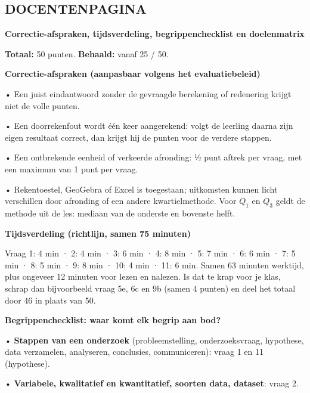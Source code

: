 \documentclass{article}
\begin{document}
\begin{docentenpagina}
\section{DOCENTENPAGINA}

\begin{oplossing}
\textbf{Correctie-afspraken, tijdsverdeling, begrippenchecklist en doelenmatrix}

\textbf{Totaal:} 50 punten. \textbf{Behaald:} vanaf 25 / 50.
\end{oplossing}

\begin{oplossing}
\textbf{Correctie-afspraken (aanpasbaar volgens het evaluatiebeleid)}

• Een juist eindantwoord zonder de gevraagde berekening of redenering krijgt niet de volle punten.

• Een doorrekenfout wordt één keer aangerekend: volgt de leerling daarna zijn eigen resultaat correct, dan krijgt hij de punten voor de verdere stappen.

• Een ontbrekende eenheid of verkeerde afronding: ½ punt aftrek per vraag, met een maximum van 1 punt per vraag.

• Rekentoestel, GeoGebra of Excel is toegestaan; uitkomsten kunnen licht verschillen door afronding of een andere kwartielmethode. Voor $Q_1$ en $Q_3$ geldt de methode uit de les: mediaan van de onderste en bovenste helft.
\end{oplossing}

\begin{oplossing}
\textbf{Tijdsverdeling (richtlijn, samen 75 minuten)}

Vraag 1: 4 min · 2: 4 min · 3: 6 min · 4: 8 min · 5: 7 min · 6: 6 min · 7: 5 min · 8: 5 min · 9: 8 min · 10: 4 min · 11: 6 min. Samen 63 minuten werktijd, plus ongeveer 12 minuten voor lezen en nalezen. Is dat te krap voor je klas, schrap dan bijvoorbeeld vraag 5e, 6c en 9b (samen 4 punten) en deel het totaal door 46 in plaats van 50.
\end{oplossing}

\begin{oplossing}
\textbf{Begrippenchecklist: waar komt elk begrip aan bod?}

• \textbf{Stappen van een onderzoek} (probleemstelling, onderzoeksvraag, hypothese, data verzamelen, analyseren, conclusies, communiceren): vraag 1 en 11 (hypothese).

• \textbf{Variabele, kwalitatief en kwantitatief, soorten data, dataset}: vraag 2.


\end{oplossing}
\end{docentenpagina}
\end{document}
